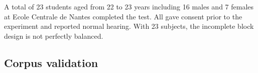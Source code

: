 \documentclass[twocolumn]{article}
\begin{document}
A total of 23 students aged from 22 to 23 years including 16 males and 7 females at Ecole Centrale de Nantes completed the test. All gave consent prior to the experiment and reported normal hearing. With 23 subjects, the incomplete block design is not perfectly balanced.

\subsection{Corpus validation}
\label{sec:data_val}

%
\end{document}
